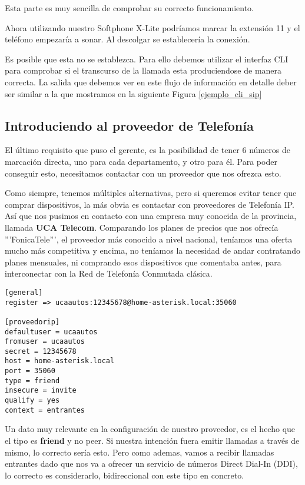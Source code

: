 Esta parte es muy sencilla de comprobar su correcto funcionamiento.

Ahora utilizando nuestro Softphone X-Lite podríamos marcar la extensión 11 y el teléfono empezaría a sonar. Al descolgar se establecería la conexión.

Es posible que esta no se establezca. Para ello debemos utilizar el interfaz CLI para comprobar si el transcurso de la llamada esta produciendose de manera correcta. La salida que debemos ver en este flujo de información en detalle deber ser similar a la que mostramos en la siguiente Figura \ref{ejemplo_cli_sip}



\newpage

\subsection{Introduciendo al proveedor de Telefonía}

El último requisito que puso el gerente, es la posibilidad de tener 6 números de marcación directa, uno para cada departamento, y otro para él. Para poder conseguir esto, necesitamos contactar con un proveedor que nos ofrezca esto.

Como siempre, tenemos múltiples alternativas, pero si queremos evitar tener que comprar dispositivos, la más obvia es contactar con proveedores de Telefonía IP. Así que nos pusimos en contacto con una empresa muy conocida de la provincia, llamada \textbf{UCA Telecom}. Comparando los planes de precios que nos ofrecía '''FonicaTele''', el proveedor más conocido a nivel nacional, teníamos una oferta mucho más competitiva y encima, no teníamos la necesidad de andar contratando planes mensuales, ni comprando esos dispositivos que comentaba antes, para interconectar con la Red de Telefonía Conmutada clásica.

\begin{lstlisting}[style=bash,title={/etc/asterisk/sip.conf}]
[general]
register => ucaautos:12345678@home-asterisk.local:35060

[proveedorip]
defaultuser = ucaautos
fromuser = ucaautos
secret = 12345678
host = home-asterisk.local
port = 35060
type = friend
insecure = invite
qualify = yes
context = entrantes
\end{lstlisting}

Un dato muy relevante en la configuración de nuestro proveedor, es el hecho que el tipo es \textbf{friend} y no peer. Si nuestra intención fuera emitir llamadas a través de mismo, lo correcto sería esto. Pero como ademas, vamos a recibir llamadas entrantes dado que nos va a ofrecer un servicio de números Direct Dial-In (DDI), lo correcto es considerarlo, bidireccional con este tipo en concreto.

